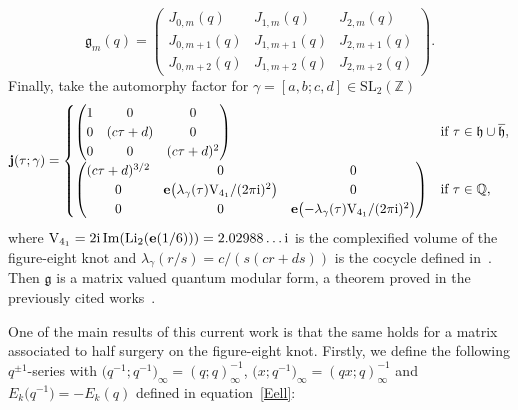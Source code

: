 \documentclass[pdftex]{sigma}
\numberwithin{equation}{section}
\def\BZ{\mathbb{Z}}
\def\BQ{\mathbb{Q}}
\def\SL{\mathrm{SL}}
\def\Li{\mathrm{Li}}
\def\e{\mathbf e}
\def\VC{\mathrm{VC}}
\def\SL{\mathrm{SL}}
\def\UHP{\mathfrak{h}}
\def\BZ{\mathbb Z}
\def\BQ{\mathbb Q}
\def\SL{\mathrm{SL}}
\def\Li{\operatorname{Li}}
\def\Im{\operatorname{Im}}
\def\VC{\mathrm{V}}
\begin{document}
\begin{Example}
\[
 \mathfrak{g}_{m}(q)
  =
 \begin{pmatrix}
 J_{0,m}(q) & J_{1,m}(q) & J_{2,m}(q)\\
 J_{0,m+1}(q) & J_{1,m+1}(q) & J_{2,m+1}(q)\\
 J_{0,m+2}(q) & J_{1,m+2}(q) & J_{2,m+2}(q)
 \end{pmatrix} .
\]
Finally, take the automorphy factor for $\gamma=[a,b;c,d]\in\SL_{2}(\BZ)$
\[
 \mathbf{j}(\tau;\gamma)
  =
 \begin{cases}
 \begin{pmatrix}
 1 & 0 & 0\\
 0 & (c\tau+d) & 0\\
 0 & 0 & (c\tau+d)^{2}
 \end{pmatrix} & \text{if }\tau\in\UHP\cup\overline{\UHP} ,\\
 \begin{pmatrix}
 (c\tau+d)^{3/2} & 0 & 0\\
 0 & \e\bigl(\lambda_{\gamma}(\tau)\VC_{4_1}/(2\pi {\rm i})^2\bigr) & 0\\
 0 & 0 & \e\bigl(-\lambda_{\gamma}(\tau)\VC_{4_1}/(2\pi {\rm i})^2\bigr)
 \end{pmatrix} & \text{if }\tau\in\BQ,
 \end{cases}
\]
where $\VC_{4_1}=2{\rm i}\Im(\Li_2(\e(1/6)))=2.02988\dots {\rm i}$ is the complexified volume of the figure-eight knot and $\lambda_{\gamma}(r/s)=c/(s(cr+ds))$ is the cocycle defined in~\cite[equation (24)]{GZ:RQMOD}. Then $\mathfrak{g}$ is a matrix valued quantum modular form, a theorem proved in the previously cited works~\cite{GGM:I,GGMW,GK:rat,GK:qser,GZ:qser,GZ:RQMOD,Wh:thesis}.
\end{Example}
One of the main results of this current work is that the same holds for a matrix associated to half surgery on the figure-eight knot. Firstly, we define the following $q^{\pm1}$-series with $\bigl(q^{-1};q^{-1}\bigr)_{\infty}=(q;q)_{\infty}^{-1}$, $\bigl(x;q^{-1}\bigr)_{\infty}=(qx;q)_{\infty}^{-1}$ and $E_{k}\bigl(q^{-1}\bigr)=-E_{k}(q)$ defined in equation~\eqref{Eell}:
\end{document}
